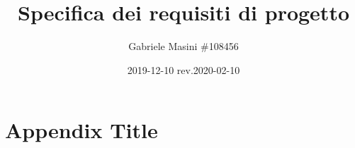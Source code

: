 \documentclass{report}
\title{
    \srsnomeprogetto\linebreak
    \large \textit \srslongnomeprogetto \linebreak
    \large Specifica dei requisiti di progetto}
\author{Gabriele Masini \#108456}
\date{2019-12-10 rev.2020-02-10}
\begin{document}
    
\maketitle
{}
\newpage
\tableofcontents
\newpage
{}











\appendix
\chapter{Appendix Title}

\end{document}
